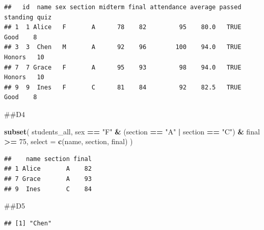 \documentclass[
]{article}
\newenvironment{Shaded}{\begin{snugshade}}{\end{snugshade}}
\newcommand{\AttributeTok}[1]{\textcolor[rgb]{0.13,0.29,0.53}{#1}}
\newcommand{\DecValTok}[1]{\textcolor[rgb]{0.00,0.00,0.81}{#1}}
\newcommand{\FunctionTok}[1]{\textcolor[rgb]{0.13,0.29,0.53}{\textbf{#1}}}
\newcommand{\NormalTok}[1]{#1}
\newcommand{\OtherTok}[1]{\textcolor[rgb]{0.56,0.35,0.01}{#1}}
\newcommand{\SpecialCharTok}[1]{\textcolor[rgb]{0.81,0.36,0.00}{\textbf{#1}}}
\newcommand{\StringTok}[1]{\textcolor[rgb]{0.31,0.60,0.02}{#1}}
\begin{document}
\begin{verbatim}
##   id  name sex section midterm final attendance average passed standing quiz
## 1  1 Alice   F       A      78    82         95    80.0   TRUE     Good    8
## 3  3  Chen   M       A      92    96        100    94.0   TRUE   Honors   10
## 7  7 Grace   F       A      95    93         98    94.0   TRUE   Honors   10
## 9  9  Ines   F       C      81    84         92    82.5   TRUE     Good    8
\end{verbatim}

\#\#D4

\begin{Shaded}
\begin{Highlighting}[]
\FunctionTok{subset}\NormalTok{(}
\NormalTok{  students\_all, }
\NormalTok{  sex }\SpecialCharTok{==} \StringTok{"F"} \SpecialCharTok{\&}\NormalTok{ (section }\SpecialCharTok{==} \StringTok{"A"} \SpecialCharTok{|}\NormalTok{ section }\SpecialCharTok{==} \StringTok{"C"}\NormalTok{) }\SpecialCharTok{\&}\NormalTok{ final }\SpecialCharTok{\textgreater{}=} \DecValTok{75}\NormalTok{, }
  \AttributeTok{select =} \FunctionTok{c}\NormalTok{(name, section, final)}
\NormalTok{)}
\end{Highlighting}
\end{Shaded}

\begin{verbatim}
##    name section final
## 1 Alice       A    82
## 7 Grace       A    93
## 9  Ines       C    84
\end{verbatim}

\#\#D5

\begin{Shaded}
\end{Shaded}

\begin{verbatim}
## [1] "Chen"
\end{verbatim}

\begin{Shaded}
\end{Shaded}
\end{document}
